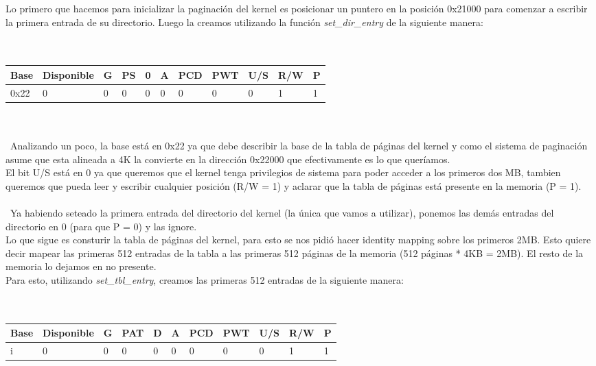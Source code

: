 Lo primero que hacemos para inicializar la paginación del kernel es posicionar un puntero en la posición 0x21000 para comenzar a escribir la primera entrada de su directorio. Luego la creamos utilizando la función \textit{set\_dir\_entry} de la siguiente manera:\\
\\\
\begin{tabular}{|l|l|l|l|l|l|l|l|l|l|l|}
	\hline
	Base & Disponible & G & PS & 0 & A & PCD & PWT & U/S & R/W & P\\
	\hline
	0x22 & 0 & 0 & 0 & 0 & 0 & 0 & 0 & 0 & 1 & 1\\
	\hline
\end{tabular}
\\ \\\
Analizando un poco, la base está en 0x22 ya que debe describir la base de la tabla de páginas del kernel y como el sistema de paginación asume que esta alineada a 4K la convierte en la dirección 0x22000 que efectivamente es lo que queríamos. \\
El bit U/S está en 0 ya que queremos que el kernel tenga privilegios de sistema para poder acceder a los primeros dos MB, tambien queremos que pueda leer y escribir cualquier posición (R/W = 1) y aclarar que la tabla de páginas está presente en la memoria (P = 1).\\
\\\
Ya habiendo seteado la primera entrada del directorio del kernel (la única que vamos a utilizar), ponemos las demás entradas del directorio en 0 (para que P = 0) y las ignore.\\
Lo que sigue es consturir la tabla de páginas del kernel, para esto se nos pidió hacer identity mapping sobre los primeros 2MB. Esto quiere decir mapear las primeras 512 entradas de la tabla a las primeras 512 páginas de la memoria (512 páginas * 4KB = 2MB). El resto de la memoria lo dejamos en no presente.\\
Para esto, utilizando \textit{set\_tbl\_entry}, creamos las primeras 512 entradas de la siguiente manera:\\
\\\
\begin{tabular}{|l|l|l|l|l|l|l|l|l|l|l|}
	\hline
	Base & Disponible & G & PAT & D & A & PCD & PWT & U/S & R/W & P\\
	\hline
	i & 0 & 0 & 0 & 0 & 0 & 0 & 0 & 0 & 1 & 1\\
	\hline
\end{tabular}
\\ \\\

